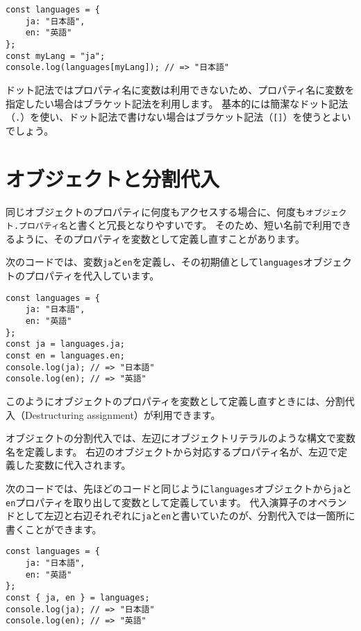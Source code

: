 \begin{lstlisting}
const languages = {
    ja: "日本語",
    en: "英語"
};
const myLang = "ja";
console.log(languages[myLang]); // => "日本語"
\end{lstlisting}

\enlargethispage{\baselineskip}ドット記法ではプロパティ名に変数は利用できないため、プロパティ名に変数を指定したい場合はブラケット記法を利用します。
基本的には簡潔なドット記法（\texttt{.}）を使い、ドット記法で書けない場合はブラケット記法（\texttt{[]}）を使うとよいでしょう。

\hypertarget{object-destructuring}{%
\section[オブジェクトと分割代入]{オブジェクトと分割代入\,\protect{}}\label{object-destructuring}}

同じオブジェクトのプロパティに何度もアクセスする場合に、何度も\texttt{オブジェクト.\hbox{}プロパティ名}と書くと冗長となりやすいです。
そのため、短い名前で利用できるように、そのプロパティを変数として定義し直すことがあります。

次のコードでは、変数\texttt{ja}と\texttt{en}を定義し、その初期値として\texttt{languages}オブジェクトのプロパティを代入しています。

\begin{lstlisting}
const languages = {
    ja: "日本語",
    en: "英語"
};
const ja = languages.ja;
const en = languages.en;
console.log(ja); // => "日本語"
console.log(en); // => "英語"
\end{lstlisting}

このようにオブジェクトのプロパティを変数として定義し直すときには、分割代入（Destructuring
assignment）が利用できます。

オブジェクトの分割代入では、左辺にオブジェクトリテラルのような構文で変数名を定義します。
右辺のオブジェクトから対応するプロパティ名が、左辺で定義した変数に代入されます。

次のコードでは、先ほどのコードと同じように\texttt{languages}オブジェクトから\texttt{ja}と\texttt{en}プロパティを取り出して変数として定義しています。
代入演算子のオペランドとして左辺と右辺それぞれに\texttt{ja}と\texttt{en}と書いていたのが、分割代入では一箇所に書くことができます。

\begin{lstlisting}
const languages = {
    ja: "日本語",
    en: "英語"
};
const { ja, en } = languages;
console.log(ja); // => "日本語"
console.log(en); // => "英語"
\end{lstlisting}

